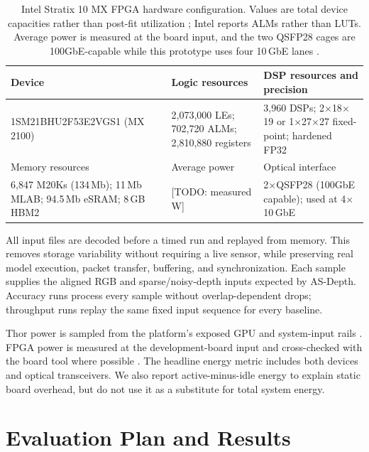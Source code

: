 \documentclass[sigconf]{support/acmart}
\newcommand{\todo}[1]{\textcolor{ACMRed}{[TODO: #1]}}
\begin{document}
\begin{table}[t]
  \caption{Intel Stratix 10 MX FPGA hardware configuration.  Values are total
  device capacities rather than post-fit utilization \cite{intels10mxproduct};
  Intel reports ALMs rather than LUTs.  Average power is measured at the board
  input, and the two QSFP28 cages are 100GbE-capable while this prototype uses
  four 10\,GbE lanes \cite{intels10mxboard,intels10mxdsp}.}
  \label{tab:fpga-hardware}
  \centering
  \small
  \begin{tabular}{p{}p{}p{}}
    \toprule
    Device & Logic resources & DSP resources and precision \\
    \midrule
    1SM21BHU2F53E2VGS1 (MX 2100) &
    2,073,000 LEs; 702,720 ALMs; 2,810,880 registers &
    3,960 DSPs; 2$\times$18$\times$19 or 1$\times$27$\times$27 fixed-point; hardened FP32 \\
    \midrule
    Memory resources & Average power & Optical interface \\
    \midrule
    6,847 M20Ks (134\,Mb); 11\,Mb MLAB; 94.5\,Mb eSRAM; 8\,GB HBM2 &
    \todo{measured W} &
    2$\times$QSFP28 (100GbE capable); used at 4$\times$10\,GbE \\
    \bottomrule
  \end{tabular}
\end{table}

All input files are decoded before a timed run and replayed from memory.  This
removes storage variability without requiring a live sensor, while preserving
real model execution, packet transfer, buffering, and synchronization.  Each
sample supplies the aligned RGB and sparse/noisy-depth inputs expected by
AS-Depth.  Accuracy runs process every sample without overlap-dependent drops;
throughput runs replay the same fixed input sequence for every baseline.

Thor power is sampled from the platform's exposed GPU and system-input rails
\cite{nvidiathorpower}.  FPGA power is measured at the development-board input
and cross-checked with the board tool where possible \cite{intels10mx}.  The
headline energy metric includes both devices and optical transceivers.  We also
report active-minus-idle energy to explain static board overhead, but do not use
it as a substitute for total system energy.

\section{Evaluation Plan and Results}
\label{sec:evaluation}
\end{document}
